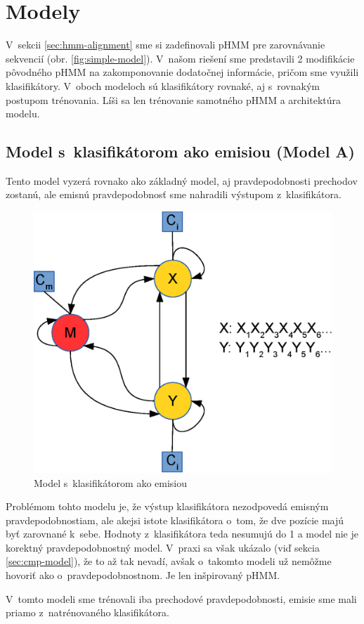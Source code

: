 \chapter{Modely}

V~sekcii \ref{sec:hmm-alignment} sme si zadefinovali pHMM pre zarovnávanie sekvencií (obr. \ref{fig:simple-model}).
V~našom riešení sme predstavili 2 modifikácie pôvodného pHMM na zakomponovanie dodatočnej informácie, pričom sme využili klasifikátory. V~oboch modeloch sú klasifikátory rovnaké, aj s~rovnakým postupom trénovania. Líši sa len trénovanie samotného pHMM a architektúra modelu.

\section[Model s~klasifikátorom ako emisiou]{Model s~klasifikátorom ako emisiou (Model A)}
\label{sec:model-clf}

Tento model vyzerá rovnako ako základný model, aj pravdepodobnosti prechodov zostanú, ale emisnú pravdepodobnosť sme nahradili výstupom z~klasifikátora.

\begin{figure}[htp]
    \centering
    \includegraphics[width=.5\textwidth]{images/model_clf}
    \caption{Model s~klasifikátorom ako emisiou}
\end{figure}

Problémom tohto modelu je, že výstup klasifikátora nezodpovedá emisným pravdepodobnostiam, ale akejsi istote klasifikátora o~tom, že dve pozície majú byť zarovnané k~sebe. Hodnoty z~klasifikátora teda nesumujú do 1 a model nie je korektný pravdepodobnostný model. V~praxi sa však ukázalo (viď sekcia \ref{sec:cmp-model}), že to až tak nevadí, avšak o~takomto modeli už nemôžme hovoriť ako o~pravdepodobnostnom. Je len inšpirovaný pHMM.

V~tomto modeli sme trénovali iba prechodové pravdepodobnosti, emisie sme mali priamo z~natrénovaného klasifikátora.

